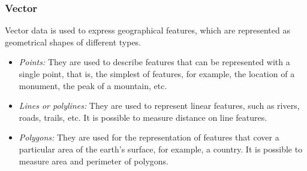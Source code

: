 \subsubsection*{Vector}

Vector data is used to express geographical features, which are represented as geometrical shapes of different types.

\begin{itemize}
	\item \emph{Points:} They are used to describe features that can be represented with a single point, that is, the simplest of features, for example, the location of a monument, the peak of a mountain, etc.
	\item \emph{Lines or polylines:} They are used to represent linear features, such as rivers, roads, trails, etc. It is possible to measure distance on line features.
	\item \emph{Polygons:} They are used for the representation of features that cover a particular area of the earth's surface, for example, a country. It is possible to measure area and perimeter of polygons.
\end{itemize}










